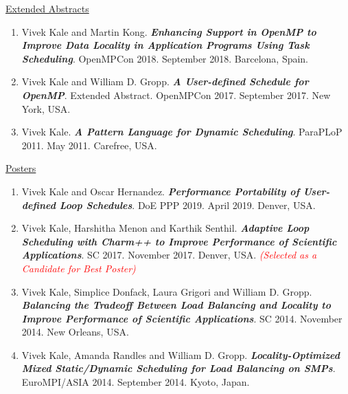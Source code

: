 \underline{Extended Abstracts}
\begin{enumerate}
\item Vivek Kale and Martin Kong. \textbf{\textit{Enhancing Support in OpenMP to Improve Data Locality in Application Programs Using Task Scheduling}}. OpenMPCon 2018. September 2018. Barcelona, Spain.
\item Vivek Kale and William D. Gropp. \textbf{\textit{A User-defined Schedule for OpenMP}}. Extended Abstract. OpenMPCon
  2017. September 2017. New York, USA.
\item Vivek Kale. \textbf{\textit{A Pattern Language for Dynamic Scheduling}}. ParaPLoP 2011. May 2011. Carefree, USA.
\end{enumerate}

\underline{Posters}
\begin{enumerate}
\item Vivek Kale and Oscar Hernandez. {\bf\textit{Performance Portability of User-defined Loop Schedules}}. DoE PPP 2019. April 2019. Denver, USA.
\item Vivek Kale, Harshitha Menon and Karthik Senthil. \textbf{\textit{Adaptive Loop Scheduling with Charm++ to Improve Performance of Scientific Applications}}. SC 2017. November 2017. Denver, USA. \textit{\textcolor{red}{(Selected as a Candidate for Best Poster)}}
\item Vivek Kale, Simplice Donfack, Laura Grigori and William D. Gropp. \textbf{\textit{Balancing the Tradeoff Between Load Balancing and Locality to Improve Performance of Scientific Applications}}. SC 2014. November 2014. New Orleans, USA.
\item Vivek Kale, Amanda Randles and William D. Gropp. \textbf{\textit{Locality-Optimized Mixed Static/Dynamic
      Scheduling for Load Balancing on SMPs}}. EuroMPI/ASIA 2014. September 2014. Kyoto, Japan.
\end{enumerate}



